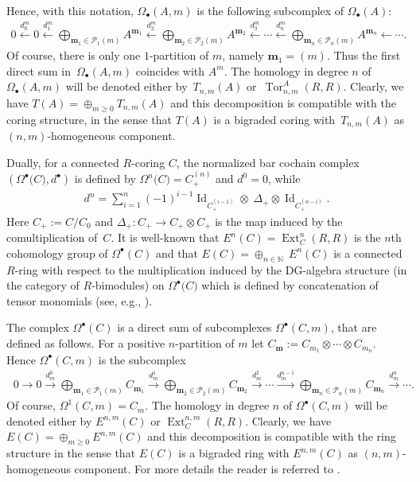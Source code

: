 \documentclass[11pt]{article}
\def\b{\bullet}
\DeclareMathOperator{\I}{Id}
\newcommand\ot{\otimes}
\newcommand{\Cp}[1]{C_+^{(#1)}}
\newcommand{\Ou}[2]{\Omega^{#1}\big(#2\big)}
\renewcommand{\^}[1]{\mbox{$^{\left( #1 \right)}$}}
\renewcommand{\_}[1]{\mbox{$_{\left( #1 \right)}$}}
\numberwithin{equation}{section}
\begin{document}
Hence, with this notation, $\Omega_\bullet(A,m)$ is the following subcomplex of $\Omega_\bullet(A)$:
\begin{gather*}
0 \xleftarrow{d_0^m} 0 \xleftarrow{d_1^m} \bigoplus \limits_{\boldsymbol{m}_1\in\mathscr{P}_1(m)} A^{\boldsymbol{m}_1} \xleftarrow{d_2^m} \bigoplus \limits_{\boldsymbol{m}_2\in\mathscr{P}_2(m)} A^{\boldsymbol{m}_2}\xleftarrow{d_3^m} \cdots \xleftarrow{d^m_n}  \bigoplus \limits_{\boldsymbol{m}_n\in\mathscr{P}_{n}(m)} A^{\boldsymbol{m}_n}\xleftarrow{\ \ \ }\cdots .
\end{gather*}
Of course, there is only one $1$-partition of $m$, namely $\boldsymbol{m}_1=(m)$. Thus the f\/irst direct sum in~$\Omega_\bullet(A,m)$ coincides with $A^m$. The homology in degree $n$ of $\Omega_\bullet(A,m)$ will be denoted either by~$T_{n,m}(A)$ or~$\operatorname{Tor}_{n,m}^A(R,R)$. Clearly, we have $T(A)=\oplus_{m\geq 0} T_{n,m}(A)$ and this decomposition is compatible with the coring structure, in the sense that $T(A)$ is a bigraded coring with~$T_{n,m}(A)$ as $(n,m)$-homogeneous component.
	
Dually, for a connected $R$-coring $C$, the normalized bar cochain complex $(\Ou{\bullet}{C}, d^\b)$ is def\/ined by $\Ou{n}{C}=\Cp{n}$ and $d^0=0$, while
\begin{gather*}
d^n=\sum_{i=1}^{n}(-1)^{i-1}\I_{C_+^{(i-1)}}\ot\;\Delta_+\ot\I_{C_+^{(n-i)}}.
\end{gather*}
Here $C_+:=C/C_0$ and $\Delta_+\colon C_+\to C_+\ot C_+$ is the map induced by the comultiplication of~$C$. It is well-known that $E^n(C)=\operatorname{Ext}^n_C(R,R)$ is the $n$th cohomology group of $\Omega^\bullet(C)$ and that $E(C)=\oplus_{n \in \mathbb{N}} \ E^n(C)$ is a connected $R$-ring with respect to the multiplication induced by the DG-algebra structure (in the category of $R$-bimodules) on $\Ou{\b}{C}$ which is def\/ined by concatenation of tensor monomials (see, e.g., \cite[Section~1.1]{PP}).

The complex $\Omega^\b(C)$ is a direct sum of subcomplexes $\Omega^\b(C,m)$, that are def\/ined as follows. For a positive $n$-partition of $m$ let $C_{\boldsymbol{m}}:=C_{m_1}\ot \cdots\ot C_{m_n}$. Hence $\Omega^\b(C,m)$ is the subcomplex
\begin{gather*}
\ 0 \xrightarrow{\ \ \ } 0 \xrightarrow{d_m^0} \bigoplus \limits_{\boldsymbol{m}_1\in\mathscr{P}_1(m)} C_{\boldsymbol{m}_1} \xrightarrow{d_m^1} \bigoplus \limits_{\boldsymbol{m}_2\in\mathscr{P}_2(m)} C_{\boldsymbol{m}_2} \xrightarrow{d_m^2} \cdots \xrightarrow{d^{n-1}_m}  \bigoplus \limits_{\boldsymbol{m}_n\in\mathscr{P}_{n}(m)} C_{\boldsymbol{m}_n} \xrightarrow{d_m^n}\cdots .
\end{gather*}
Of course, $\Omega^1(C,m)=C_m$. The homology in degree $n$ of $\Omega^\bullet(C,m)$ will be denoted either by $E^{n,m}(C)$ or $\operatorname{Ext}^{n,m}_C(R,R)$. Clearly, we have $E(C)=\oplus_{m\geq 0}E^{n,m}(C)$ and this decomposition is compatible with the ring structure in the sense that $E(C)$ is a bigraded ring with $E^{n,m}(C)$ as $(n,m)$-homogeneous component. For more details the reader is referred to \cite[Section~1.15]{jps}.
\end{document}
